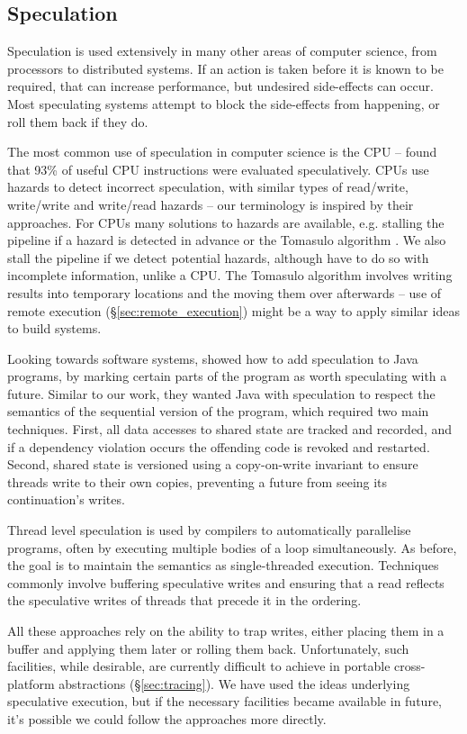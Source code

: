 \subsection{Speculation}

Speculation is used extensively in many other areas of computer science, from processors to distributed systems. If an action is taken before it is known to be required, that can increase performance, but undesired side-effects can occur. Most speculating systems attempt to block the side-effects from happening, or roll them back if they do.

The most common use of speculation in computer science is the CPU -- \citet{swanson_cpu_speculation} found that 93\% of useful CPU instructions were evaluated speculatively. CPUs use hazards to detect incorrect speculation, with similar types of read/write, write/write and write/read hazards \cite{patterson_cpu_design} -- our terminology is inspired by their approaches. For CPUs many solutions to hazards are available, e.g. stalling the pipeline if a hazard is detected in advance or the Tomasulo algorithm \cite{tomasulo}. We also stall the pipeline if we detect potential hazards, although have to do so with incomplete information, unlike a CPU. The Tomasulo algorithm involves writing results into temporary locations and the moving them over afterwards -- use of remote execution (\S\ref{sec:remote_execution}) might be a way to apply similar ideas to build systems.

Looking towards software systems, \citet{welc2005safe} showed how to add speculation to Java programs, by marking certain parts of the program as worth speculating with a future. Similar to our work, they wanted Java with speculation to respect the semantics of the sequential version of the program, which required two main techniques. First, all data accesses to shared state are tracked and recorded, and if a dependency violation occurs the offending code is revoked and restarted.  Second, shared state is versioned using a copy-on-write invariant to ensure threads write to their own copies, preventing a future from seeing its continuation's writes.

Thread level speculation \cite{steffan1998potential} is used by compilers to automatically parallelise programs, often by executing multiple bodies of a loop simultaneously. As before, the goal is to maintain the semantics as single-threaded execution. Techniques commonly involve buffering speculative writes \cite{steffan2000scalable} and ensuring that a read reflects the speculative writes of threads that precede it in the ordering.

All these approaches rely on the ability to trap writes, either placing them in a buffer and applying them later or rolling them back. Unfortunately, such facilities, while desirable, are currently difficult to achieve in portable cross-platform abstractions (\S\ref{sec:tracing}). We have used the ideas underlying speculative execution, but if the necessary facilities became available in future, it's possible we could follow the approaches more directly.
